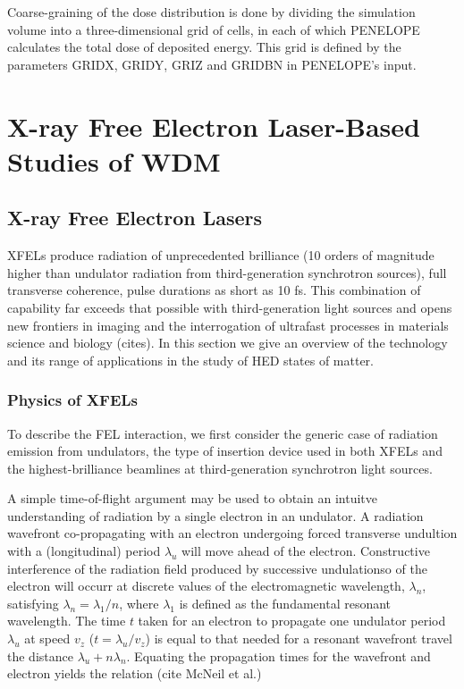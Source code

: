 \documentclass [11pt, proquest, article] {uwthesis}[2016/11/22]
\begin{document}
Coarse-graining of the dose distribution is done by dividing the simulation volume into a three-dimensional grid of cells, in each of which PENELOPE calculates the total dose of deposited energy. This grid is defined by the parameters GRIDX, GRIDY, GRIZ and GRIDBN in PENELOPE's input. 

\chapter{X-ray Free Electron Laser-Based Studies of WDM}
\section{X-ray Free Electron Lasers}
XFELs produce radiation of unprecedented brilliance (10 orders of magnitude higher than undulator radiation from third-generation synchrotron sources), full transverse coherence, pulse durations as short as 10 fs. This combination of capability far exceeds that possible with third-generation light sources and opens new frontiers in imaging and the interrogation of ultrafast processes in materials science and biology (cites). In this section we give an overview of the technology and its range of applications in the study of HED states of matter.

\subsection{Physics of XFELs}
To describe the FEL interaction, we first consider the generic case of radiation emission from undulators, the type of insertion device used in both XFELs and the highest-brilliance beamlines at third-generation synchrotron light sources.

A simple time-of-flight argument may be used to obtain an intuitve understanding of radiation by a single electron in an undulator. A radiation wavefront co-propagating with an electron undergoing forced transverse undultion with a (longitudinal) period $\lambda_u$ will move ahead of the electron. Constructive interference of the radiation field produced by successive undulationso of the electron will occurr at discrete values of the electromagnetic wavelength, $\lambda_n$, satisfying $\lambda_n = \lambda_1 / n$, where $\lambda_1$ is defined as the fundamental resonant wavelength. The time $t$ taken for an electron to propagate one undulator period $\lambda_u$ at speed $v_z$ ($t = \lambda_u/v_z$) is equal to that needed for a resonant wavefront travel the distance $\lambda_u + n \lambda_n$. Equating the propagation times for the wavefront and electron yields the relation (cite McNeil et al.)
\end{document}
